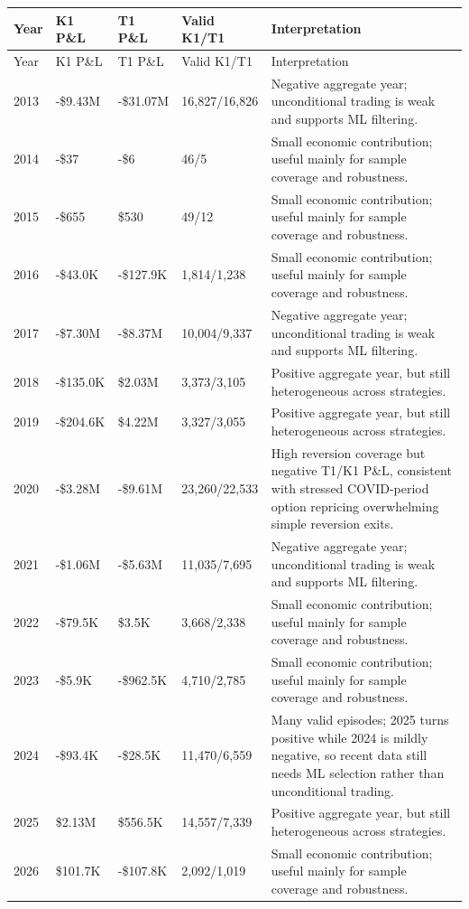 \documentclass[11pt]{article}
\begin{document}
\small
\begin{longtable}{llllp{5.2cm}}
\toprule
Year & K1 P\&L & T1 P\&L & Valid K1/T1 & Interpretation \\
\midrule
\endfirsthead
\toprule
Year & K1 P\&L & T1 P\&L & Valid K1/T1 & Interpretation \\
\midrule
\endhead
2013 & -\$9.43M & -\$31.07M & 16,827/16,826 & Negative aggregate year; unconditional trading is weak and supports ML filtering. \\
2014 & -\$37 & -\$6 & 46/5 & Small economic contribution; useful mainly for sample coverage and robustness. \\
2015 & -\$655 & \$530 & 49/12 & Small economic contribution; useful mainly for sample coverage and robustness. \\
2016 & -\$43.0K & -\$127.9K & 1,814/1,238 & Small economic contribution; useful mainly for sample coverage and robustness. \\
2017 & -\$7.30M & -\$8.37M & 10,004/9,337 & Negative aggregate year; unconditional trading is weak and supports ML filtering. \\
2018 & -\$135.0K & \$2.03M & 3,373/3,105 & Positive aggregate year, but still heterogeneous across strategies. \\
2019 & -\$204.6K & \$4.22M & 3,327/3,055 & Positive aggregate year, but still heterogeneous across strategies. \\
2020 & -\$3.28M & -\$9.61M & 23,260/22,533 & High reversion coverage but negative T1/K1 P\&L, consistent with stressed COVID-period option repricing overwhelming simple reversion exits. \\
2021 & -\$1.06M & -\$5.63M & 11,035/7,695 & Negative aggregate year; unconditional trading is weak and supports ML filtering. \\
2022 & -\$79.5K & \$3.5K & 3,668/2,338 & Small economic contribution; useful mainly for sample coverage and robustness. \\
2023 & -\$5.9K & -\$962.5K & 4,710/2,785 & Small economic contribution; useful mainly for sample coverage and robustness. \\
2024 & -\$93.4K & -\$28.5K & 11,470/6,559 & Many valid episodes; 2025 turns positive while 2024 is mildly negative, so recent data still needs ML selection rather than unconditional trading. \\
2025 & \$2.13M & \$556.5K & 14,557/7,339 & Positive aggregate year, but still heterogeneous across strategies. \\
2026 & \$101.7K & -\$107.8K & 2,092/1,019 & Small economic contribution; useful mainly for sample coverage and robustness. \\
\bottomrule
\end{longtable}
\normalsize
\end{document}
